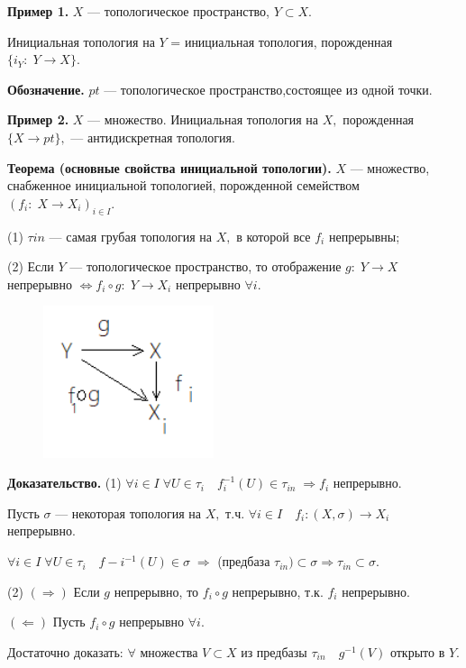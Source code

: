 \documentclass[12pt,a4paper]{article}
\begin{document}
\textbf{Пример 1.} $X$ --- топологическое пространство, $Y \subset X.$

Инициальная топология на $Y$ = инициальная топология, порожденная $\{i_{Y}: \; Y \to X\}.$ 

\textbf{Обозначение.} $pt$ --- топологическое пространство,состоящее из одной точки.

\textbf{Пример 2.} $X$ --- множество. Инициальная топология на $X,$ порожденная $\{X \to pt\},$ --- антидискретная топология. 

\textbf{Теорема (основные свойства инициальной топологии).} $X$ --- множество, снабженное инициальной топологией, порожденной семейством $(f_{i}: \; X \to X_{i})_{i \in I}.$ 

(1) $\tau{in}$ --- самая грубая топология на $X,$ в которой все $f_{i}$ непрерывны; 

(2) Если $Y$ --- топологическое пространство, то отображение $g: \; Y \to X$ непрерывно $\Leftrightarrow f_{i} \circ g: \; Y \to X_{i}$ непрерывно $\forall i.$ 

\begin{figure}
	\includegraphics[width = 5cm]{lect6_3.png}
\end{figure}

\textbf{Доказательство.} (1) $\forall i \in I \; \forall U \in \tau_{i} \quad f_{i}^{-1}(U) \in \tau_{in} \; \Rightarrow f_{i}$ непрерывно.

Пусть $\sigma$ --- некоторая топология на $X,$ т.ч. $\forall i \in I \quad f_{i}: (X, \sigma) \to X_{i}$ непрерывно. 

$\forall i \in I \; \forall U \in \tau_{i} \quad f-{i}^{-1}(U) \in \sigma \; \Rightarrow$ (предбаза $\tau_{in}) \subset \sigma \Rightarrow \tau_{in} \subset \sigma.$ 

(2) $(\Rightarrow)$ Если $g$ непрерывно, то $f_{i} \circ g$ непрерывно, т.к. $f_{i}$ непрерывно. 

$(\Leftarrow)$ Пусть $f_{i} \circ g$ непрерывно $\forall i.$ 

Достаточно доказать: $\forall$ множества $V \subset X$ из предбазы $\tau_{in} \quad g^{-1}(V)$ открыто в $Y.$
\end{document}

